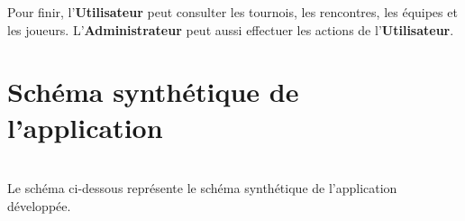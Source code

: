 \documentclass[10pt]{report}
\begin{document}
Pour finir, l'\textbf{Utilisateur} peut consulter les tournois, les rencontres, les équipes et les joueurs.
L'\textbf{Administrateur} peut aussi effectuer les actions de l'\textbf{Utilisateur}.

\newpage
\section{Schéma synthétique de l'application}
~\\
Le schéma ci-dessous représente le schéma synthétique de l'application développée. \\
	\begin{figure}[hp]
	      \begin{center}
	      \end{center}
	\end{figure}
\end{document}

